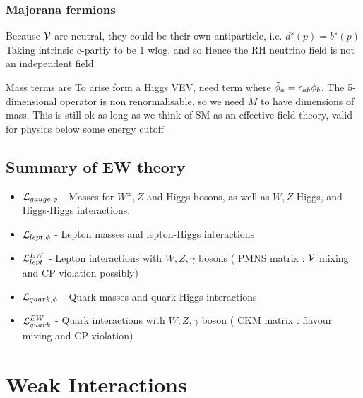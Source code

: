 \documentclass{article}
\begin{document}
\subsubsection*{Majorana fermions}
Because $\mathcal{V}$ are neutral, they could be their own antiparticle, i.e. $d^s(p) = b^s(p)$
Taking intrinsic c-partiy to be 1 wlog, 
and so 
Hence the RH neutrino field is not an independent field.

Mass terms are 
To arise form a Higgs VEV, need term 
where $\tilde{\phi}_a = \epsilon_{ab} \phi_b$. 
The 5-dimensional operator is non renormalisable, so we need $M$ to have dimensions of mass. This is still ok as long as we think of SM as an effective field theory, valid for physics below some energy cutoff

\subsection{Summary of EW theory}
\begin{itemize}
    \item $\mathcal{L}_{gauge, \phi}$ - Masses for $W^\pm, Z$ and Higgs bosons, as well as $W,Z$-Higgs, and Higgs-Higgs interactions. 
    \item $\mathcal{L}_{lept, \phi}$ - Lepton masses and lepton-Higgs interactions 
    \item $\mathcal{L}_{lept}^{EW}$ - Lepton interactions with $W,Z,\gamma$ bosons ( PMNS matrix : $\mathcal{V}$ mixing and CP violation possibly) 
    \item $\mathcal{L}_{quark, \phi}$ - Quark masses and quark-Higgs interactions 
    \item $\mathcal{L}_{quark}^{EW}$ - Quark interactions with $W,Z,\gamma$ boson ( CKM matrix : flavour mixing and CP violation)
\end{itemize}

\section{Weak Interactions}
\end{document}
